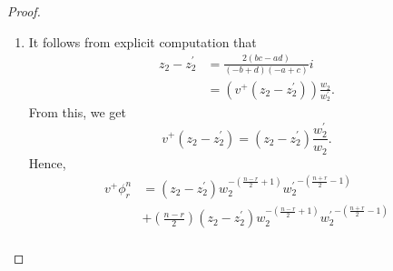 \documentclass[11pt, a4paper]{amsart}
\theoremstyle{plain}
\theoremstyle{definition}
\numberwithin{equation}{section}
\begin{document}
\begin{proof}
\begin{enumerate}
\begin{align*}
\begin{pmatrix}
                                                                    a & b \\
                                                                    c & d
                                                                  \end{pmatrix}), \\
                  & (v^{+}w_2^{\prime})(\begin{pmatrix}
                            a & b \\
                            c & d
                          \end{pmatrix}) = 0.                                                  
              \end{align*}
              The proof for $v^{-}(w_2)$ and $v^{-}(w_2^{\prime})$ is similar. \\
              It can be seen from the quotient rule that
              \begin{align*}
                  & (v^{+}z_2) = \frac{(v^{+}(b + d))(-b + d) - (v^{+}(-b + d))(b + d)}{(-b + d)^{2}}i = \frac{2(ad - bc)}{(-b + d)^{2}}i, \\
                  & (v^{+}z_2^{\prime}) = \frac{(v^{+}(a + c))(-a + c) - (v^{+}(-a + c))(a + c)}{(-a + c)^{2}}i = 0. 
              \end{align*}
              The proof for $v^{-}(z_2)$ and $v^{-}(z_2^{\prime})$ is similar. 
        \item It follows from explicit computation that
              \begin{align*}
                  z_2 - z_2^{\prime} &= \frac{2(bc - ad)}{(-b + d)(-a + c)}i \\
                                     &= (v^{+}(z_2 - z_2^{\prime}))\frac{w_2}{w_2^{\prime}}. 
              \end{align*}
              From this, we get 
              \begin{equation*}
                  v^{+}(z_2 - z_2^{\prime}) = (z_2 - z_2^{\prime}) \frac{w_2^{\prime}}{w_2}. 
              \end{equation*}
              Hence, 
              \begin{align*}
                  v^{+}\phi^{n}_{r} & =  (z_2 - z_2^{\prime})w_{2}^{-(\frac{n - r}{2} + 1)}{w_{2}^{\prime}}^{-(\frac{n + r}{2} - 1)}\\   
                  &+ (\frac{n - r}{2}) (z_2 - z_2^{\prime})w_{2}^{-(\frac{n - r}{2} + 1)}{w_{2}^{\prime}}^{-(\frac{n + r}{2} - 1)}\\

\end{align*}
\end{enumerate}
\end{proof}
\end{document}
